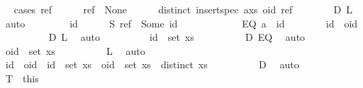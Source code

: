 \begin{isabellebody}
\ \ \isamarkupfalse%
{\isacharparenleft}cases\ {\isachardoublequoteopen}ref{\isachardoublequoteclose}{\isacharparenright}\isanewline
\ \ \ \ \isamarkupfalse%
\ {\isachardoublequoteopen}ref\ {\isacharequal}\ None{\isachardoublequoteclose}\isanewline
\ \ \ \ \isamarkupfalse%
\ {\isachardoublequoteopen}distinct\ {\isacharparenleft}insert{\isacharunderscore}spec\ {\isacharparenleft}a{\isacharhash}xs{\isacharparenright}\ {\isacharparenleft}oid{\isacharcomma}\ ref{\isacharparenright}{\isacharparenright}{\isachardoublequoteclose}\isanewline
\ \ \ \ \ \ \isamarkupfalse%
\ D\ L\ \isamarkupfalse%
\ auto\isanewline
\ \ \isamarkupfalse%
\isanewline
\ \ \ \ \isamarkupfalse%
\ id\isanewline
\ \ \ \ \isamarkupfalse%
\ S{\isacharcolon}\ {\isachardoublequoteopen}ref\ {\isacharequal}\ Some\ id{\isachardoublequoteclose}\isanewline
\ \ \ \ \isacommand{{\isacharbraceleft}}\isamarkupfalse%
\isanewline
\ \ \ \ \ \ \isamarkupfalse%
\ EQ{\isacharcolon}\ {\isachardoublequoteopen}a\ {\isacharequal}\ id{\isachardoublequoteclose}\isanewline
\ \ \ \ \ \ \isamarkupfalse%
\ {\isachardoublequoteopen}id\ {\isasymnoteq}\ oid{\isachardoublequoteclose}\isanewline
\ \ \ \ \ \ \ \ \isamarkupfalse%
\ D\ L\ \isamarkupfalse%
\ auto\isanewline
\ \ \ \ \ \ \isamarkupfalse%
\ \isamarkupfalse%
\ {\isachardoublequoteopen}id\ {\isasymnotin}\ set\ xs{\isachardoublequoteclose}\isanewline
\ \ \ \ \ \ \ \ \isamarkupfalse%
\ D\ EQ\ \isamarkupfalse%
\ auto\isanewline
\ \ \ \ \ \ \isamarkupfalse%
\ \isamarkupfalse%
\ {\isachardoublequoteopen}oid\ {\isasymnotin}\ set\ xs{\isachardoublequoteclose}\isanewline
\ \ \ \ \ \ \ \ \isamarkupfalse%
\ L\ \isamarkupfalse%
\ auto\isanewline
\ \ \ \ \ \ \isamarkupfalse%
\ \isamarkupfalse%
\ {\isachardoublequoteopen}id\ {\isasymnoteq}\ oid\ {\isasymand}\ id\ {\isasymnotin}\ set\ xs\ {\isasymand}\ oid\ {\isasymnotin}\ set\ xs\ {\isasymand}\ distinct\ xs{\isachardoublequoteclose}\isanewline
\ \ \ \ \ \ \ \ \isamarkupfalse%
\ D\ \isamarkupfalse%
\ auto\isanewline
\ \ \ \ \isacommand{{\isacharbraceright}}\isamarkupfalse%
\isanewline
\ \ \ \ \isamarkupfalse%
\ T\ {\isacharequal}\ this\isanewline
\ \ \ \ \isacommand{{\isacharbraceleft}}\isamarkupfalse%

\end{isabellebody}
